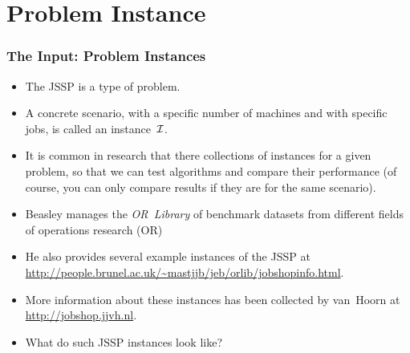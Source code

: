 \documentclass[mathserif]{beamer}%
\begin{document}
\section{Problem Instance}%
%
\begin{frame}%
\frametitle{The Input: Problem Instances}%
\begin{itemize}%
\item The JSSP is a \alert<2>{type} of problem.%
\item<2-> A concrete scenario, with a specific number of machines and with specific jobs, is called an \mbox{\alert<2>{instance~$\mathcal{I}$}}.%
\item<3-> It is common in research that there collections of instances for a given problem, so that we can test algorithms and compare their performance (of course, you can only compare results if they are for the same scenario).%
\item<4-> \mbox{Beasley\cite{B1990OLDTPBEM}} manages the \emph{OR~Library} of benchmark datasets from different fields of operations research (OR)%
\item<5-> He also provides several example instances of the JSSP at \url{http://people.brunel.ac.uk/~mastjjb/jeb/orlib/jobshopinfo.html}.%
\item<6-> More information about these instances has been collected by \mbox{van Hoorn\cite{vH2015JSIAS,vH2018TCSOBOBIOTJSSP}} at \url{http://jobshop.jjvh.nl}.
\item<7-> What do such JSSP instances look like?%
\end{itemize}%
\end{frame}%
%
\end{document}
